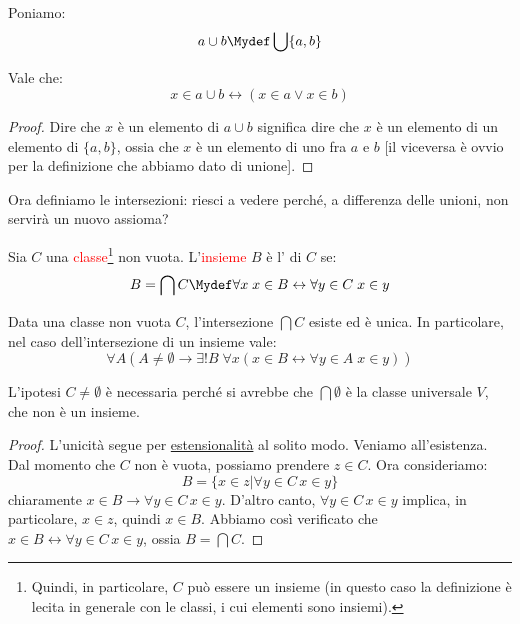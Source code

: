 \documentclass[11pt]{scrartcl}
\begin{document}
\begin{definition}
	Poniamo:
	\[ a \cup b \Mydef \bigcup\{a,b\}
		\]
\end{definition}

\begin{proposition}
	Vale che:
	\[ x \in a \cup b \leftrightarrow (x \in a \lor x \in b)
		\]
\end{proposition}

\begin{proof}
	Dire che $x$ è un elemento di $a \cup b$ significa dire che $x$ è un elemento di un elemento di $\{a,b\}$, ossia
	che $x$ è un elemento di uno fra $a$ e $b$ [il viceversa è ovvio per la definizione che abbiamo dato di unione].
\end{proof}

Ora definiamo le intersezioni: riesci a vedere perché, a differenza delle unioni, non servirà un nuovo assioma?

\begin{definition}
	Sia $C$ una \textcolor{red}{classe}\footnote{Quindi, in particolare, $C$ può essere un insieme (in questo caso la definizione è lecita in generale con le classi, i cui elementi sono insiemi).} non vuota.
	L'\textcolor{red}{insieme} $B$ è l' di $C$ se:
	\[ B = \bigcap C \Mydef \forall x \; x \in B \leftrightarrow \forall y \in C \; x \in y
		\]
\end{definition}

\begin{proposition}
	Data una classe non vuota $C$, l'intersezione $\bigcap C$ esiste ed è unica. In particolare, nel caso dell'intersezione di un insieme vale:
	\[ \forall A (A \ne \emptyset \rightarrow \exists ! B \; \forall x(x \in B \leftrightarrow \forall y \in A \; x \in y))
		\]
\end{proposition}

\begin{note}
	L'ipotesi $C \ne \emptyset$ è necessaria perché si avrebbe che $\bigcap \emptyset$ è la classe universale $V$, che non è un insieme.
\end{note}

\begin{proof}
	L'unicità segue per \hyperref[ax2]{estensionalità} al solito modo. Veniamo all'esistenza. Dal momento che $C$ non è vuota, possiamo prendere $z \in C$. 
	Ora consideriamo:
	\[ B = \{x \in z | \forall y \in C \, x \in y\}
		\]
	chiaramente $x \in B \rightarrow \forall y \in C \, x \in y$. D'altro canto, $\forall y \in C \, x \in y$ implica, in particolare, $x \in z$, quindi $x \in B$. Abbiamo 
	così verificato che $x \in B \leftrightarrow \forall y \in C \, x \in y$, ossia $B = \bigcap C$.
\end{proof}
\end{document}
